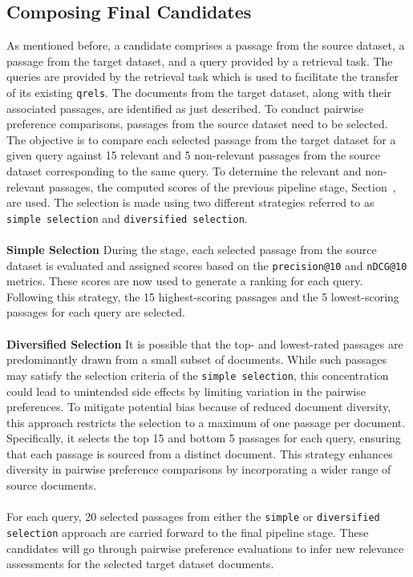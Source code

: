 \subsection{Composing Final Candidates}
As mentioned before, a candidate comprises a passage from the source dataset, a passage from the target dataset, and a query provided by a retrieval task. The queries are provided by the retrieval task which is used to facilitate the transfer of its existing \texttt{qrels}. The documents from the target dataset, along with their associated passages, are identified as just described. To conduct pairwise preference comparisons, passages from the source dataset need to be selected. The objective is to compare each selected passage from the target dataset for a given query against 15 relevant and 5 non-relevant passages from the source dataset corresponding to the same query. To determine the relevant and non-relevant passages, the computed scores of the previous pipeline stage, Section~, are used. The selection is made using two different strategies referred to as \texttt{simple selection} and \texttt{diversified selection}.
\\\\
\textbf{Simple Selection}
During the  stage, each selected passage from the source dataset is evaluated and assigned scores based on the \texttt{precision@10} and \texttt{nDCG@10} metrics. These scores are now used to generate a ranking for each query. Following this strategy, the 15 highest-scoring passages and the 5 lowest-scoring passages for each query are selected.
\\\\
\textbf{Diversified Selection}
It is possible that the top- and lowest-rated passages are predominantly drawn from a small subset of documents. While such passages may satisfy the selection criteria of the \texttt{simple selection}, this concentration could lead to unintended side effects by limiting variation in the pairwise preferences. To mitigate potential bias because of reduced document diversity, this approach restricts the selection to a maximum of one passage per document. Specifically, it selects the top 15 and bottom 5 passages for each query, ensuring that each passage is sourced from a distinct document. This strategy enhances diversity in pairwise preference comparisons by incorporating a wider range of source documents.
\\\\
For each query, 20 selected passages from either the \texttt{simple} or \texttt{diversified selection} approach are carried forward to the final pipeline stage. These candidates will go through pairwise preference evaluations to infer new relevance assessments for the selected target dataset documents.

